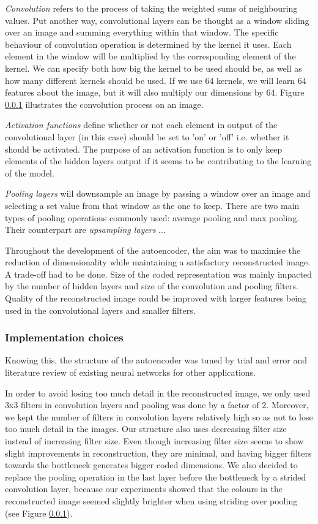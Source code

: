 \textit{Convolution} refers to the process of taking the weighted sums of neighbouring values. Put another way, convolutional layers can be thought as a window sliding over an image and summing everything within that window. The specific behaviour of convolution operation is determined by the kernel it uses. Each element in the window will be multiplied by the corresponding element of the kernel. We can specify both how big the kernel to be used should be, as well as how many different kernels should be used. If we use 64 kernels, we will learn 64 features about the image, but it will also multiply our dimensions by 64. Figure \ref{} illustrates the convolution process on an image.

\textit{Activation functions} define whether or not each element in output of the convolutional layer (in this case) should be set to 'on' or 'off' i.e. whether it should be activated. The purpose of an activation function is to only keep elements of the hidden layers output if it seems to be contributing to the learning of the model.

\textit{Pooling layers} will downsample an image by passing a window over an image and selecting a set value from that window as the one to keep. There are two main types of pooling operations commonly used: average pooling and max pooling. Their counterpart are \textit{upsampling layers} ...

Throughout the development of the autoencoder, the aim was to maximise the reduction of dimensionality while maintaining a satisfactory reconstructed image. A trade-off had to be done. Size of the coded representation was mainly impacted by the number of hidden layers and size of the convolution and pooling filters. Quality of the reconstructed image could be improved with larger features being used in the convolutional layers and smaller filters.

\hfill
\subsubsection{Implementation choices}
\hfill

Knowing this, the structure of the autoencoder was tuned by trial and error and literature review of existing neural networks for other applications.

In order to avoid losing too much detail in the reconstructed image, we only used 3x3 filters in convolution layers and pooling was done by a factor of 2. Moreover, we kept the number of filters in convolution layers relatively high so as not to lose too much detail in the images. Our structure also uses decreasing filter size instead of increasing filter size. Even though increasing filter size seems to show slight improvements in reconstruction, they are minimal, and having bigger filters towards the bottleneck generates bigger coded dimensions. We also decided to replace the pooling operation in the last layer before the bottleneck by a strided convolution layer, because our experiments showed that the colours in the reconstructed image seemed slightly brighter when using striding over pooling (see Figure \ref{}).

